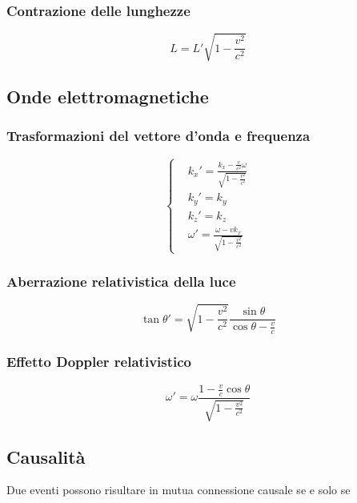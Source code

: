 \documentclass{article}
\begin{document}
\subsubsection{Contrazione delle lunghezze}

\begin{equation}
    L = L' \sqrt{1-\frac{v^2}{c^2}}
\end{equation}

\subsection{Onde elettromagnetiche}
\subsubsection{Trasformazioni del vettore d'onda e frequenza}
\begin{equation}
    \left\{
    \begin{aligned}
         & k_x'= \frac{k_x-\frac{v}{c^2}\omega}{\sqrt{1-\frac{v^2}{c^2}}} \\
         & k_y'= k_y                                                      \\
         & k_z'= k_z                                                      \\
         & \omega'= \frac{\omega-vk_x}{\sqrt{1-\frac{v^2}{c^2}}}
    \end{aligned}
    \right.
\end{equation}

\subsubsection{Aberrazione relativistica della luce}
\begin{equation}
    \tan \theta' = \sqrt{1-\frac{v^2}{c^2}}\frac{\sin \theta}{\cos \theta - \frac{v}{c}}
\end{equation}

\subsubsection{Effetto Doppler relativistico}

\begin{equation}
    \omega' = \omega\frac{1-\frac{v}{c}\cos{\theta}}{\sqrt{1-\frac{v^2}{c^2}}}
\end{equation}


\subsection{Causalità}
Due eventi possono risultare in mutua connessione causale se e solo se
\end{document}
